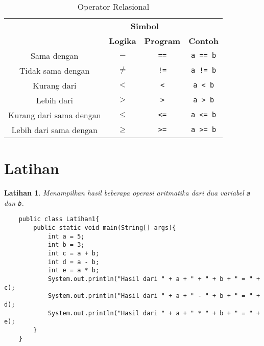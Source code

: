 \documentclass[aspectratio=169]{beamer}
\newtheorem{latihan}{Latihan}
\theoremstyle{definition}
\begin{document}
    \begin{frame}
        \frametitle{\insertsection}
        \begin{table}
            \centering
            \begin{tabular}{|c|c|c|c|}
                \hline
                \rowcolor{HIMAmuda}
                & \multicolumn{2}{c|}{\textbf{Simbol}} & \\
                \cline{2-3}
                \rowcolor{HIMAmuda}
                \multirow{-2}{*}{\textbf{Operator}}& \textbf{Logika} & \textbf{Program} &\multirow{-2}{*}{\textbf{Contoh}} \\
                \hline
                Sama dengan & $=$ & \texttt{==} & \texttt{a == b}\\
                Tidak sama dengan & $\neq$ & \texttt{!=} & \texttt{a != b}\\
                Kurang dari & $<$ & \texttt{<} & \texttt{a < b}\\
                Lebih dari & $>$ & \texttt{>} & \texttt{a > b}\\
                Kurang dari sama dengan & $\leq$ & \texttt{<=} & \texttt{a <= b}\\
                Lebih dari sama dengan & $\geq$ & \texttt{>=} & \texttt{a >= b}\\
                \hline
            \end{tabular}
            \caption{Operator Relasional}
        \end{table}
    \end{frame}

    \section{Latihan}
    \begin{frame}[fragile]
        \begin{latihan}
            Menampilkan hasil beberapa operasi aritmatika dari dua variabel \texttt{a} dan \texttt{b}.
        \end{latihan}
        \begin{lstlisting}
    public class Latihan1{
        public static void main(String[] args){
            int a = 5;
            int b = 3;
            int c = a + b;
            int d = a - b;
            int e = a * b;
            System.out.println("Hasil dari " + a + " + " + b + " = " + c);
            System.out.println("Hasil dari " + a + " - " + b + " = " + d);
            System.out.println("Hasil dari " + a + " * " + b + " = " + e);
        }
    }
        \end{lstlisting}
    \end{frame}
    
\end{document}
